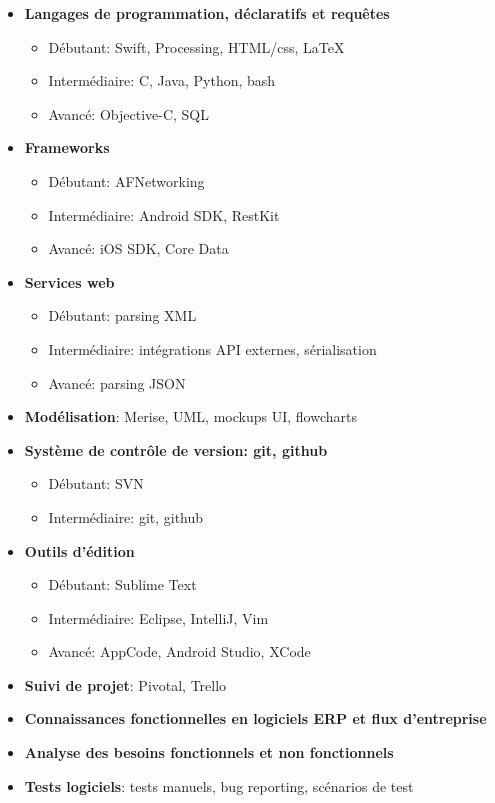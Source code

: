 \documentclass[11pt, a4paper]{moderncv}
\begin{document}
	\begin{itemize}
		\item \textbf{Langages de programmation, déclaratifs et requêtes}
			\begin{itemize}
				\item Débutant: Swift, Processing, HTML/css, LaTeX
				\item Intermédiaire: C, Java, Python, bash
				\item Avancé: Objective-C, SQL
			\end{itemize}
		\item \textbf{Frameworks}
				\begin{itemize}
					\item Débutant: AFNetworking
					\item Intermédiaire: Android SDK, RestKit
					\item Avancé: iOS SDK, Core Data
				\end{itemize}
		
		
		\pagebreak
		
		\item \textbf{Services web}
			\begin{itemize}
				\item Débutant: parsing XML
				\item Intermédiaire: intégrations API externes, sérialisation
				\item Avancé: parsing JSON
			\end{itemize}
		\item \textbf{Modélisation}: Merise, UML, mockups UI, flowcharts
		\item \textbf{Système de contrôle de version: git, github}
				\begin{itemize}
					\item Débutant: SVN
					\item Intermédiaire: git, github
				\end{itemize}
		\item \textbf{Outils d'édition}
				\begin{itemize}
					\item Débutant: Sublime Text
					\item Intermédiaire: Eclipse, IntelliJ, Vim
					\item Avancé: AppCode, Android Studio, XCode
				\end{itemize}
		\item \textbf{Suivi de projet}: Pivotal, Trello
		\item \textbf{Connaissances fonctionnelles en logiciels ERP et flux d’entreprise}
		\item \textbf{Analyse des besoins fonctionnels et non fonctionnels}
		\item \textbf{Tests logiciels}: tests manuels, bug reporting, scénarios de test
	\end{itemize}
	
\end{document}
